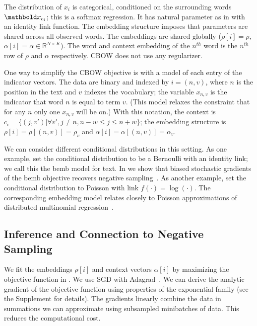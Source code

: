 \documentclass[12pt]{article}
\begin{document}
The distribution of $x_i$ is categorical, conditioned on the
surrounding words $\mbx_{c_i}$; this is a softmax regression.  It has
natural parameter as in  with an identity
link function. The embedding structure imposes that parameters are
shared across all observed words. The embeddings are shared 
globally
($\rho[i] = \rho$, $\alpha[i] = \alpha \in \mathbb{R}^{N\times K}$). 
The word and context embedding of the $n^{th}$ word is the 
$n^{th}$ row of $\rho$ and $\alpha$ respectively. 
\gls{CBOW} does not use any regularizer.

One way to simplify the \gls{CBOW} objective is with a model of each
entry of the indicator vectors. The data are binary and indexed by
$i=(n,v)$, where $n$ is the position in the text and $v$ indexes the
vocabulary; the variable $x_{n,v}$ is the indicator that word $n$ is
equal to term $v$.  (This model relaxes the constraint that for any
$n$ only one $x_{n,v}$ will be on.)  With this notation, the context
is $c_i = \{(j,v')| \forall v', j\neq n, n-w \leq j \leq n+w \}$; the
embedding structure is $\rho[i] = \rho[(n,v)] = \rho_v$ and
$\alpha[i] = \alpha[(n,v)] =\alpha_v$.

We can consider different conditional distributions in this setting.
As one example, set the conditional distribution to be a Bernoulli
with an identity link; we call this the \gls{bemb} model for text. In
 we show that biased stochastic gradients of the
\gls{bemb} objective recovers negative
sampling~\citep{mikolov2013distributed}. As another example, set the
conditional distribution to Poisson with link $f(\cdot)=\log(\cdot)$.
The corresponding embedding model relates closely to Poisson
approximations of distributed multinomial
regression~\citep{taddy2015distributed}.

\subsection{Inference and Connection to Negative Sampling}
\label{sec:inference}

We fit the embeddings $\rho[i]$ and context vectors $\alpha[i]$ by
maximizing the objective function in .  We use
\gls{SGD} with Adagrad~\citep{Duchi2011}. We can derive the analytic gradient of the objective
function using properties of the exponential family (see the Supplement
for details).
The gradients linearly combine the data in summations we can approximate using subsampled minibatches of data. This reduces the computational cost.
\end{document}
